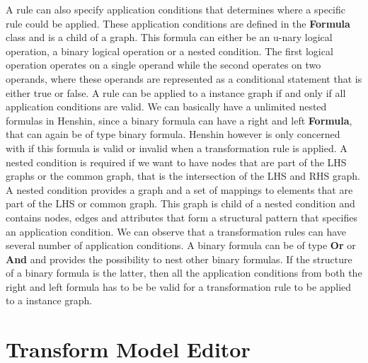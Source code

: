 A rule can also specify application conditions that determines where a specific
rule could be applied. These application conditions are defined in the
\textbf{Formula} class and is a child of a graph. This formula can either be an
u-nary logical operation, a binary logical operation or a nested condition. The
first logical operation operates on a single operand while the second operates on two
operands, where these operands are represented as a conditional statement that
is either true or false. A rule can be applied to a instance graph if and only
if all application conditions are valid. We can basically have a unlimited
nested formulas in Henshin, since a binary formula can have a right and left
\textbf{Formula}, that can again be of type binary formula. Henshin however is
only concerned with if this formula is valid or invalid when a transformation
rule is applied. A nested condition is required if we want to have nodes that
are part of the LHS graphs or the common graph, that is the intersection of the
LHS and RHS graph. A nested condition provides a graph and a set of mappings to
elements that are part of the LHS or common graph. This graph is child of
a nested condition and contains nodes, edges and attributes that form a
structural pattern that specifies an application condition. We can observe that
a transformation rules can have several number of application conditions. A
binary formula can be of type \textbf{Or} or \textbf{And} and provides the
possibility to nest other binary formulas. If the structure of a binary formula
is the latter, then all the application conditions from both the right and left
formula has to be be valid for a transformation rule to be applied to a
instance graph.

\section{Transform Model Editor}

